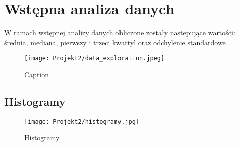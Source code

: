 \documentclass{article}
\begin{document}
\section{Wstępna analiza danych}
W ramach wstępnej analizy danych obliczone zostały nastepujące wartości: średnia, mediana, pierwszy i trzeci kwartyl oraz odchylenie standardowe .
\begin{figure}[H]
    \centering
    \texttt{[image: Projekt2/data\_exploration.jpeg]}
    \caption{Caption}
    \label{fig:enter-label}
\end{figure}
\subsection{Histogramy}

\begin{figure}[H]
    \centering
    \texttt{[image: Projekt2/histogramy.jpg]}
    \caption{Histogramy}
\end{figure}
\end{document}
